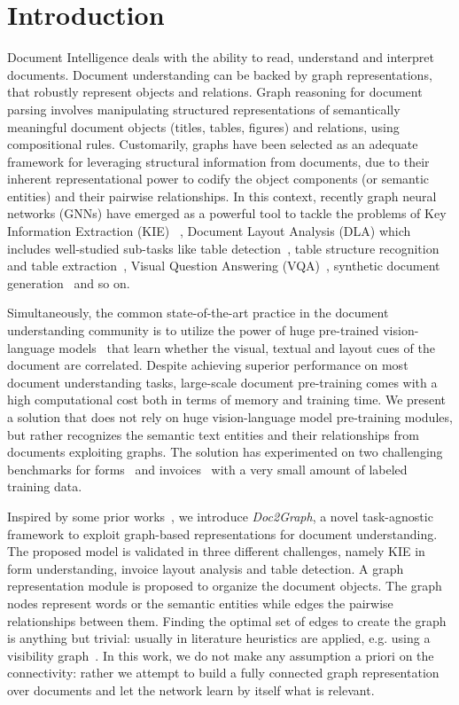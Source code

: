 \documentclass[runningheads]{llncs}
\begin{document}
\section{Introduction}\label{s:intro}
Document Intelligence deals with the ability to read, understand and interpret documents.
Document understanding can be backed by graph representations, that robustly represent objects and relations. Graph reasoning for document parsing involves manipulating structured representations of semantically meaningful document objects (titles, tables, figures) and relations, using compositional rules. Customarily,  graphs have been selected as an adequate framework for leveraging structural information from documents, due to their inherent representational power to codify the object components (or semantic entities) and their pairwise relationships. In this context, recently graph neural networks (GNNs) have emerged as a powerful tool to tackle the problems of Key Information Extraction (KIE) ~\cite{carbonell2021named,yu2021pick}, Document Layout Analysis (DLA) which includes well-studied sub-tasks like table detection~\cite{riba2019table,riba2022table}, table structure recognition~\cite{liu2022neural,xue2021tgrnet} and table extraction~\cite{gemelli-icpr}, Visual Question Answering (VQA)~\cite{liang2021multi,li2022text}, synthetic document generation~\cite{biswas2021graph} and so on. 

Simultaneously, the common state-of-the-art practice in the document understanding community is to utilize the power of huge pre-trained vision-language models~\cite{appalaraju2021docformer,xu2020layoutlmv2,xu2020layoutlm} that learn whether the visual, textual and layout cues of the document are correlated. Despite achieving superior performance on most document understanding tasks, large-scale document pre-training comes with a high computational cost both in terms of memory and training time. 
We present a solution that does not rely on huge vision-language model pre-training modules, but rather recognizes the semantic text entities and their relationships from documents exploiting graphs. The solution has experimented on two challenging benchmarks for forms~\cite{FUNSD} and invoices~\cite{goldmann_lutz_2019_3257319} with a very small amount of labeled training data. 

Inspired by some prior works~\cite{davis2021visual,riba2019table,riba2022table}, we introduce \emph{Doc2Graph}, a novel task-agnostic framework to exploit graph-based representations for document understanding. The proposed model is validated in three different challenges, namely KIE in form understanding, invoice layout analysis and table detection. 
A graph representation module is proposed to organize the document objects. The graph nodes represent words or the semantic entities while edges the pairwise relationships between them. Finding the optimal set of edges to create the graph is anything but trivial: usually in literature heuristics are applied, e.g. using a visibility graph~\cite{riba2019table}. In this work, we do not make any assumption a priori on the connectivity: rather we attempt to build a fully connected graph representation over documents and let the network learn by itself what is relevant.
\end{document}

